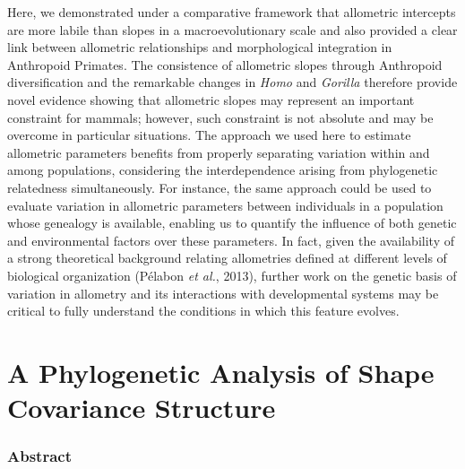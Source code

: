 \documentclass[12pt,twoside]{report}
\begin{document}
Here, we demonstrated under a comparative framework that allometric
intercepts are more labile than slopes in a macroevolutionary scale and
also provided a clear link between allometric relationships and
morphological integration in Anthropoid Primates. The consistence of
allometric slopes through Anthropoid diversification and the remarkable
changes in \emph{Homo} and \emph{Gorilla} therefore provide novel
evidence showing that allometric slopes may represent an important
constraint for mammals; however, such constraint is not absolute and may
be overcome in particular situations. The approach we used here to
estimate allometric parameters benefits from properly separating
variation within and among populations, considering the interdependence
arising from phylogenetic relatedness simultaneously. For instance, the
same approach could be used to evaluate variation in allometric
parameters between individuals in a population whose genealogy is
available, enabling us to quantify the influence of both genetic and
environmental factors over these parameters. In fact, given the
availability of a strong theoretical background relating allometries
defined at different levels of biological organization (Pélabon \emph{et
al.}, 2013), further work on the genetic basis of variation in allometry
and its interactions with developmental systems may be critical to fully
understand the conditions in which this feature evolves.

\newpage
\chapter{A Phylogenetic Analysis of Shape Covariance Structure}
\label{ch:ppca}

\subsection{Abstract}\label{abstract-2}
\end{document}
